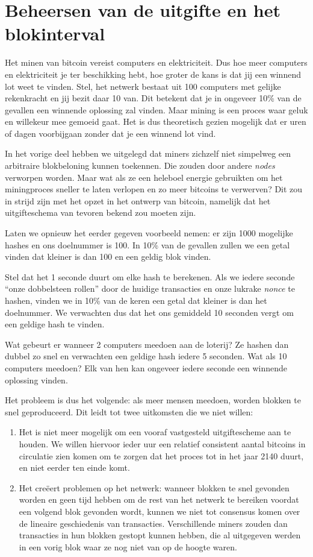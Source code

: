 \documentclass[smalldemyvopaper,11pt,twoside,onecolumn,openright,extrafontsizes]{memoir}
\begin{document}
\section{Beheersen van de uitgifte en het blokinterval}

Het minen van bitcoin vereist computers en elektriciteit. Dus hoe meer computers en elektriciteit je ter beschikking hebt, hoe groter de kans is dat jij een winnend lot weet te vinden. Stel, het netwerk bestaat uit 100 computers met gelijke rekenkracht en jij bezit daar 10 van. Dit betekent dat je in ongeveer 10\% van de gevallen een winnende oplossing zal vinden. Maar mining is een proces waar geluk en willekeur mee gemoeid gaat. Het is dus theoretisch gezien mogelijk dat er uren of dagen voorbijgaan zonder dat je een winnend lot vind.

In het vorige deel hebben we uitgelegd dat miners zichzelf niet simpelweg een arbitraire blokbeloning kunnen toekennen. Die zouden door andere \textit{nodes} verworpen worden. Maar wat als ze een heleboel energie gebruikten om het miningproces sneller te laten verlopen en zo meer bitcoins te verwerven? Dit zou in strijd zijn met het opzet in het ontwerp van bitcoin, namelijk dat het uitgifteschema van tevoren bekend zou moeten zijn.

Laten we opnieuw het eerder gegeven voorbeeld nemen: er zijn 1000 mogelijke hashes en ons doelnummer is 100. In 10\% van de gevallen zullen we een getal vinden dat kleiner is dan 100 en een geldig blok vinden.

Stel dat het 1 seconde duurt om elke hash te berekenen. Als we iedere seconde “onze dobbelsteen rollen” door de huidige transacties en onze lukrake \textit{nonce} te hashen, vinden we in 10\% van de keren een getal dat kleiner is dan het doelnummer. We verwachten dus dat het ons gemiddeld 10 seconden vergt om een geldige hash te vinden.

Wat gebeurt er wanneer 2 computers meedoen aan de loterij? Ze hashen dan dubbel zo snel en verwachten een geldige hash iedere 5 seconden. Wat als 10 computers meedoen? Elk van hen kan ongeveer iedere seconde een winnende oplossing vinden.

Het probleem is dus het volgende: als meer mensen meedoen, worden blokken te snel geproduceerd. Dit leidt tot twee uitkomsten die we niet willen:

\begin{enumerate}
    \item Het is niet meer mogelijk om een vooraf vastgesteld uitgiftescheme aan te houden. We willen hiervoor ieder uur een relatief consistent aantal bitcoins in circulatie zien komen om te zorgen dat het proces tot in het jaar 2140 duurt, en niet eerder ten einde komt.
    \item Het creëert problemen op het netwerk: wanneer blokken te snel gevonden worden en geen tijd hebben om de rest van het netwerk te bereiken voordat een volgend blok gevonden wordt, kunnen we niet tot consensus komen over de lineaire geschiedenis van transacties. Verschillende miners zouden dan transacties in hun blokken gestopt kunnen hebben, die al uitgegeven werden in een vorig blok waar ze nog niet van op de hoogte waren.
\end{enumerate}
\end{document}
